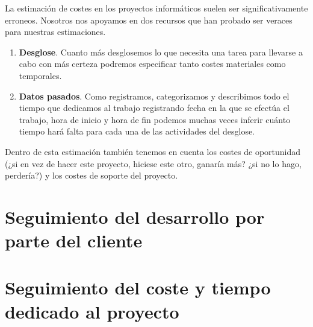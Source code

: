 La estimación de costes en los proyectos informáticos suelen
ser significativamente erroneos. Nosotros nos apoyamos en dos
recursos que han probado ser veraces para nuestras estimaciones.

\begin{enumerate}
    \item \textbf{Desglose}. Cuanto más desglosemos lo que
          necesita una tarea para llevarse a cabo con más
          certeza podremos especificar tanto costes materiales
          como temporales.
    \item \textbf{Datos pasados}. Como registramos, categorizamos
          y describimos todo el tiempo que dedicamos al trabajo
          registrando fecha en la que se efectúa el trabajo, hora
          de inicio y hora de fin podemos muchas veces inferir
          cuánto tiempo hará falta para cada una de las actividades
          del desglose.
\end{enumerate}

Dentro de esta estimación también tenemos en cuenta los costes de
oportunidad (¿si en vez de hacer este proyecto, hiciese este otro,
ganaría más? ¿si no lo hago, perdería?) y los costes de soporte del proyecto.

\section{Seguimiento del desarrollo por parte del cliente}


\section{Seguimiento del coste y tiempo dedicado al proyecto}



